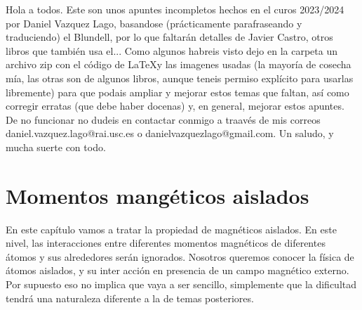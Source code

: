 \documentclass[12pt,a4paper]{book}
\numberwithin{equation}{section}
\numberwithin{figure}{section}
\begin{document}



\newpage
    Hola a todos. Este son unos apuntes incompletos hechos en el curos 2023/2024 por Daniel Vazquez Lago, basandose (prácticamente parafraseando y traduciendo) el Blundell, por lo que faltarán detalles de Javier Castro, otros libros que también usa el... Como algunos habreis visto dejo en la carpeta un archivo zip con el código de \LaTeX y las imagenes usadas (la mayoría de cosecha mía, las otras son de algunos libros, aunque teneis permiso explícito para usarlas libremente) para que podais ampliar y mejorar estos temas que faltan, así como corregir erratas (que debe haber docenas) y, en general, mejorar estos apuntes. De no funcionar no dudeis en contactar conmigo a traavés de mis correos daniel.vazquez.lago@rai.usc.es o danielvazquezlago@gmail.com. Un saludo, y mucha suerte con todo.
\newpage

\chapter{Momentos mangéticos aislados}

En este capítulo vamos a tratar la propiedad de magnéticos aislados. En este nivel, las interacciones entre diferentes momentos magnéticos de diferentes átomos y sus alrededores serán ignorados. Nosotros queremos conocer la física de átomos aislados, y su inter
acción en presencia de un campo magnético externo. Por supuesto eso no implica que vaya a ser sencillo, simplemente que la dificultad tendrá una naturaleza diferente a la de temas posteriores. 
\end{document}
